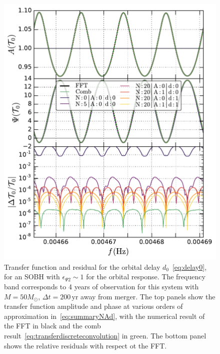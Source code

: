 \documentclass[aps,showpacs,twocolumn,
prd,superscriptaddress,nofootinbib]{revtex4-1}
\newcommand{\yr}{\,\mathrm{yr}}
\newcommand{\Msol}{M_{\odot}}
\begin{document}
\begin{figure}
  \centering
  \includegraphics[width=.98\linewidth]{plots/LISAtransfererrorSOBHepsPsi1d0corr_py.pdf}
  \caption{Transfer function and residual for the orbital delay $d_{0}$~\eqref{eq:delay0}, for an SOBH with $\epsilon_{\Psi 2}\sim 1$ for the orbital response. The frequency band corresponds to 4 years of observation for this system with $M=50\Msol$, $\Delta t = 200\yr$ away from merger. The top panels show the transfer function amplitude and phase at various orders of approximation in~\eqref{eq:summaryNAd}, with the numerical result of the FFT in black and the comb result~\eqref{eq:transferdiscreteconvolution} in green. The bottom panel shows the relative residuals with respect ot the FFT.}
  \label{fig:LISAerrorSOBHepsPsi1d0}
\end{figure}
\end{document}
